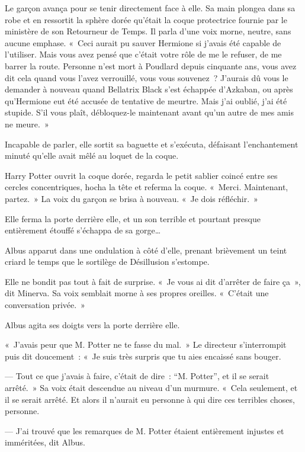Le garçon avança pour se tenir directement face à elle. Sa main plongea dans sa robe et en ressortit la sphère dorée qu'était la coque protectrice fournie par le ministère de son Retourneur de Temps. Il parla d'une voix morne, neutre, sans aucune emphase. «~Ceci aurait pu sauver Hermione si j'avais été capable de l'utiliser. Mais vous avez pensé que c'était votre rôle de me le refuser, de me barrer la route. Personne n'est mort à Poudlard depuis cinquante ans, vous avez dit cela quand vous l'avez verrouillé, vous vous souvenez~? J'aurais dû vous le demander à nouveau quand Bellatrix Black s'est échappée d'Azkaban, ou après qu'Hermione eut été accusée de tentative de meurtre. Mais j'ai oublié, j'ai été stupide. S'il vous plaît, débloquez-le maintenant avant qu'un autre de mes amis ne meure.~»

Incapable de parler, elle sortit sa baguette et s'exécuta, défaisant l'enchantement minuté qu'elle avait mêlé au loquet de la coque.

Harry Potter ouvrit la coque dorée, regarda le petit sablier coincé entre ses cercles concentriques, hocha la tête et referma la coque. «~Merci. Maintenant, partez.~» La voix du garçon se brisa à nouveau. «~Je dois réfléchir.~»

\later

Elle ferma la porte derrière elle, et un son terrible et pourtant presque entièrement étouffé s'échappa de sa gorge…

Albus apparut dans une ondulation à côté d'elle, prenant brièvement un teint criard le temps que le sortilège de Désillusion s'estompe.

Elle ne bondit pas tout à fait de surprise. «~Je vous ai dit d'arrêter de faire ça~», dit Minerva. Sa voix semblait morne à ses propres oreilles. «~C'était une conversation privée.~»

Albus agita ses doigts vers la porte derrière elle.

«~J'avais peur que M. Potter ne te fasse du mal.~» Le directeur s'interrompit puis dit doucement~: «~Je suis très surpris que tu aies encaissé sans bouger.

--- Tout ce que j'avais à faire, c'était de dire~: “M. Potter”, et il se serait arrêté.~» Sa voix était descendue au niveau d'un murmure. «~Cela seulement, et il se serait arrêté. Et alors il n'aurait eu personne à qui dire ces terribles choses, personne.

--- J'ai trouvé que les remarques de M. Potter étaient entièrement injustes et imméritées, dit Albus.

